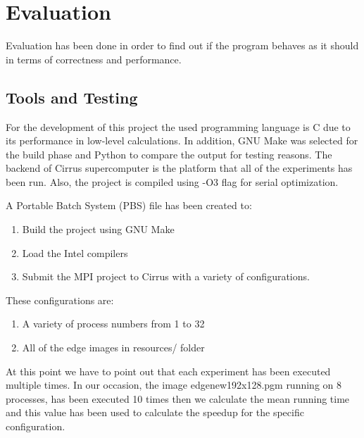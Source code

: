 \documentclass[12pt,a4paper]{article}
\newcommand{\sectionVspacing}{\vspace{15pt}}
\begin{document}
\sectionVspacing

\section{Evaluation}
    Evaluation has been done in order to find out if the program behaves as it should in terms of correctness and performance.

    \subsection{Tools and Testing}
        For the development of this project the used programming language is C due to its performance in low-level calculations. In addition, GNU Make was selected for the build phase and Python to compare the output for testing reasons. The backend of Cirrus supercomputer is the platform that all of the experiments has been run. Also, the project is compiled using -O3 flag for serial optimization.

        A Portable Batch System (PBS) file has been created to:
        \begin{enumerate}
          \item Build the project using GNU Make
          \item Load the Intel compilers
          \item Submit the MPI project to Cirrus with a variety of configurations.
        \end{enumerate}

        These configurations are:
        \begin{enumerate}
          \item A variety of process numbers from 1 to 32
          \item All of the edge images in resources/ folder
        \end{enumerate}

        At this point we have to point out that each experiment has been executed multiple times. In our occasion, the image edgenew192x128.pgm running on 8 processes, has been executed 10 times then we calculate the mean running time and this value has been used to calculate the speedup for the specific configuration.
\end{document}
